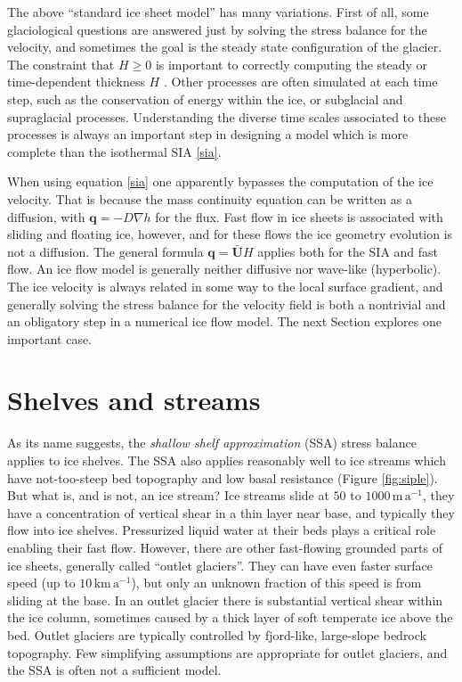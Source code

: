\documentclass[letterpaper,final,12pt,reqno]{amsart}
\newcommand{\bq}{\mathbf{q}}
\newcommand{\bU}{\mathbf{U}}
\begin{document}
The above ``standard ice sheet model'' has many variations.  First of all, some glaciological questions are answered just by solving the stress balance for the velocity, and sometimes the goal is the steady state configuration of the glacier.  The constraint that $H\ge 0$ is important to correctly computing the steady or time-dependent thickness $H$ \cite{Bueler2016,JouvetBueler2012}.  Other processes are often simulated at each time step, such as the conservation of energy within the ice, or subglacial and supraglacial processes.  Understanding the diverse time scales associated to these processes is always an important step in designing a model which is more complete than the isothermal SIA \eqref{sia}.

When using equation \eqref{sia} one apparently bypasses the computation of the ice velocity.  That is because the mass continuity equation can be written as a diffusion, with $\bq=-D\nabla h$ for the flux.  Fast flow in ice sheets is associated with sliding and floating ice, however, and for these flows the ice geometry evolution is not a diffusion.  The general formula $\bq = \bar{\bU} H$ applies both for the SIA and fast flow.  An ice flow model is generally neither diffusive nor wave-like (hyperbolic).  The ice velocity is always related in some way to the local surface gradient, and generally solving the stress balance for the velocity field is both a nontrivial and an obligatory step in a numerical ice flow model.  The next Section explores one important case.


\section{Shelves and streams}  \label{sec:shelvesandstreams}

As its name suggests, the \emph{shallow shelf approximation} (SSA) stress balance applies to ice shelves.  The SSA also applies reasonably well to ice streams which have not-too-steep bed topography and low basal resistance (Figure \ref{fig:siple}).  But what is, and is not, an ice stream?  Ice streams slide at $50$ to $1000 \,\text{m}\,\text{a}^{-1}$, they have a concentration of vertical shear in a thin layer near base, and typically they flow into ice shelves.  Pressurized liquid water at their beds plays a critical role enabling their fast flow.  However, there are other fast-flowing grounded parts of ice sheets,  generally called ``outlet glaciers''.  They can have even faster surface speed (up to $10 \,\text{km}\,\text{a}^{-1}$), but only an unknown fraction of this speed is from sliding at the base.  In an outlet glacier there is substantial vertical shear within the ice column, sometimes caused by a thick layer of soft temperate ice above the bed.  Outlet glaciers are typically controlled by fjord-like, large-slope bedrock topography.  Few simplifying assumptions are appropriate for outlet glaciers, and the SSA is often not a sufficient model.
\end{document}
